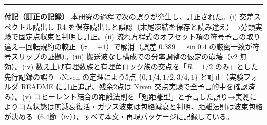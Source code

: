 \documentclass[
  a4paper,
]{ltjsarticle}
\begin{document}
\begin{center}\rule{0.5\linewidth}{0.5pt}\end{center}

\textbf{付記（訂正の記録）}
本研究の過程で次の誤りが発生し、訂正された。(i) 交差スペクトル読出し R4
を保存読出しと誤認（末尾凍結を保存と読み違え）→分類実験で固定点収束と判明し訂正。(ii)
流れ方程式のオフセット項の符号予言の取り違え→回転規約の較正（\(\sigma=+1\)）で解消（誤差
\(0.389=\sin0.4\) の厳密一致が符号スリップの証拠）。(iii)
搬送波なし構成での分率調整の仮定の崩壊（v2 無効）。(iv)
数え上げ有理数族と有理角ロック族の交点を「\(R=1/2\)
のみ」とした先行記録の誤り→Niven の定理により5点 \(\{0,1/4,1/2,3/4,1\}\)
と訂正（実験フォルダ README に訂正追記、残余2点は Niven
交点実験で全予言的中を確認済み）。(v)
コヒーレント結合の距離法則を「短距離型」と予言した誤り→実測によりコム状態は無減衰復活・ガウス波束は包絡減衰と判明、距離法則は波束包絡が決める（6.4節（iv））。すべて本文・再現パッケージに記録している。
\end{document}
